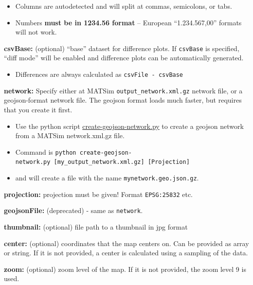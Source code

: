 \begin{itemize}
\tightlist
\item
  Columns are autodetected and will split at commas, semicolons, or
  tabs.
\item
  Numbers \textbf{must be in 1234.56 format} -- European
  ``1.234.567,00'' formats will not work.
\end{itemize}

\textbf{csvBase:} (optional) ``base'' dataset for difference plots. If
\texttt{csvBase} is specified, ``diff mode'' will be enabled and
difference plots can be automatically generated.

\begin{itemize}
\tightlist
\item
  Differences are always calculated as
  \texttt{\textquotesingle{}csvFile\ -\ csvBase\textquotesingle{}}
\end{itemize}

\textbf{network:} Specify either at MATSim
\texttt{output\_network.xml.gz} network file, or a geojson-format
network file. The geojson format loads much faster, but requires that
you create it first.

\begin{itemize}
\tightlist
\item
  Use the python script
  \href{https://raw.githubusercontent.com/simwrapper/simwrapper/master/scripts/create-geojson-network.py}{create-geojson-network.py}
  to create a geojson network from a MATSim network.xml.gz file.
\item
  Command is
  \texttt{python\ create-geojson-network.py\ {[}my\_output\_network.xml.gz{]}\ {[}Projection{]}}
\item
  and will create a file with the name \texttt{mynetwork.geo.json.gz}.
\end{itemize}

\textbf{projection:} projection must be given! Format
\texttt{EPSG:25832} etc.

\textbf{geojsonFile:} (deprecated) - same as \texttt{network}.

\textbf{thumbnail:} (optional) file path to a thumbnail in jpg format

\textbf{center:} (optional) coordinates that the map centers on. Can be
provided as array or string. If it is not provided, a center is
calculated using a sampling of the data.

\textbf{zoom:} (optional) zoom level of the map. If it is not provided,
the zoom level 9 is used.

